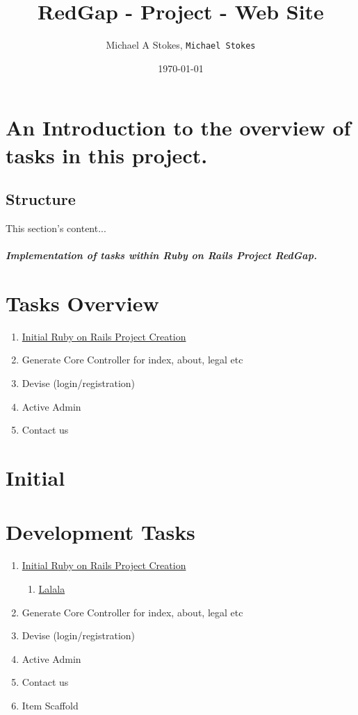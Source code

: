 \documentclass[11pt]{report}
\begin{document}
\title{RedGap - Project - Web Site}
\author{Michael A Stokes, \texttt{Michael Stokes}}
\date{\today}
\maketitle

\clearpage

\tableofcontents
\label{sec:tableofcontents}
\newpage

\chapter[Introduction]{An Introduction to the overview of tasks in this project.}

	\section{Structure}
	This section's content...

	\paragraph{Implementation of tasks within Ruby on Rails Project RedGap.}

\chapter{Tasks Overview}

\begin{enumerate}
	\item \hyperref[sec:initial]{Initial Ruby on Rails Project Creation}
	\item Generate Core Controller for index, about, legal etc
	\item Devise (login/registration)
	\item Active Admin
	\item Contact us
\end{enumerate}

\chapter{Initial}
\label{sec:initial}

\chapter{Development Tasks}
\label{sec:tasks}

\begin{enumerate}

	\item \hyperref[sec:initial]{Initial Ruby on Rails Project Creation}
		\begin{enumerate}
			\item \hyperref[sec:initial]{Lalala}
		\end{enumerate}

	\item Generate Core Controller for index, about, legal etc
	\item Devise (login/registration)
	\item Active Admin
	\item Contact us
	\item Item Scaffold
\end{enumerate}
\end{document}
